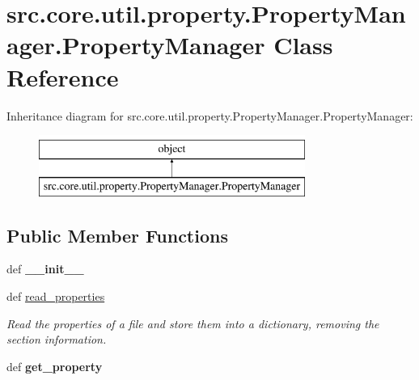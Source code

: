 \hypertarget{classsrc_1_1core_1_1util_1_1property_1_1PropertyManager_1_1PropertyManager}{\section{src.\-core.\-util.\-property.\-Property\-Manager.\-Property\-Manager Class Reference}
\label{classsrc_1_1core_1_1util_1_1property_1_1PropertyManager_1_1PropertyManager}
}
Inheritance diagram for src.\-core.\-util.\-property.\-Property\-Manager.\-Property\-Manager\-:\begin{figure}[H]
\begin{center}
\leavevmode
\includegraphics[height=2.000000cm]{classsrc_1_1core_1_1util_1_1property_1_1PropertyManager_1_1PropertyManager}
\end{center}
\end{figure}
\subsection*{Public Member Functions}
\begin{DoxyCompactItemize}
\item 
\hypertarget{classsrc_1_1core_1_1util_1_1property_1_1PropertyManager_1_1PropertyManager_a129d32da4be72bc35ecb436276470755}{def {\bfseries \-\_\-\-\_\-init\-\_\-\-\_\-}}\label{classsrc_1_1core_1_1util_1_1property_1_1PropertyManager_1_1PropertyManager_a129d32da4be72bc35ecb436276470755}

\item 
def \hyperlink{classsrc_1_1core_1_1util_1_1property_1_1PropertyManager_1_1PropertyManager_a38b2e5dedf6195a946823090523dbe7c}{read\-\_\-properties}
\begin{DoxyCompactList}\small\item\em Read the properties of a file and store them into a dictionary, removing the section information. \end{DoxyCompactList}\item 
\hypertarget{classsrc_1_1core_1_1util_1_1property_1_1PropertyManager_1_1PropertyManager_a6db0bc4785a5115e859b1709002f5816}{def {\bfseries get\-\_\-property}}\label{classsrc_1_1core_1_1util_1_1property_1_1PropertyManager_1_1PropertyManager_a6db0bc4785a5115e859b1709002f5816}

\end{DoxyCompactItemize}
